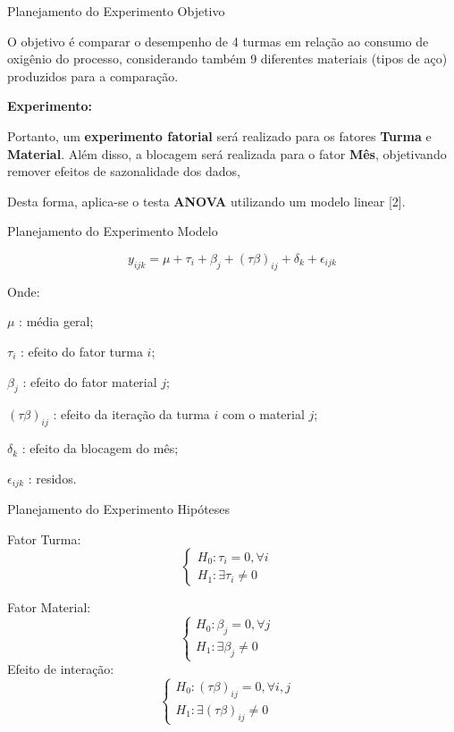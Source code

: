 \documentclass[
  ignorenonframetext,
]{beamer}
\begin{document}
\begin{frame}{Planejamento do Experimento \textbar{} Objetivo}
\protect\hypertarget{planejamento-do-experimento-objetivo}{}

O objetivo é comparar o desempenho de 4 turmas em relação ao consumo de
oxigênio do processo, considerando também 9 diferentes materiais (tipos
de aço) produzidos para a comparação.

\textbf{Experimento:}

Portanto, um \textbf{experimento fatorial} será realizado para os
fatores \textbf{Turma} e \textbf{Material}. Além disso, a blocagem será
realizada para o fator \textbf{Mês}, objetivando remover efeitos de
sazonalidade dos dados,

Desta forma, aplica-se o testa \textbf{ANOVA} utilizando um modelo
linear {[}2{]}.

\end{frame}

\begin{frame}{Planejamento do Experimento \textbar{} Modelo}
\protect\hypertarget{planejamento-do-experimento-modelo}{}

\[\begin{equation}y_{ijk} = \mu + \tau_i + \beta_j + (\tau\beta)_{ij} + \delta_k +  \epsilon_{ijk}  \end{equation}\]

Onde:

\(\mu\) : média geral;

\(\tau_i\) : efeito do fator turma \(i\);

\(\beta_j\) : efeito do fator material \(j\);

\((\tau\beta)_{ij}\) : efeito da iteração da turma \(i\) com o material
\(j\);

\(\delta_k\) : efeito da blocagem do mês;

\(\epsilon_{ijk}\) : residos.

\end{frame}

\begin{frame}{Planejamento do Experimento \textbar{} Hipóteses}
\protect\hypertarget{planejamento-do-experimento-hipoteses}{}

Fator Turma:
\[\begin{cases} H_0: \tau_{i} = 0, \forall i &\\H_1:\exists \tau_{i} \neq 0 \end{cases}\]

Fator Material:
\[\begin{cases} H_0: \beta_{j} = 0, \forall j &\\H_1:\exists \beta_{j} \neq 0 \end{cases}\]
Efeito de interação:
\[\begin{cases} H_0: (\tau\beta)_{ij} = 0, \forall i,j &\\H_1:\exists (\tau\beta)_{ij} \neq 0 \end{cases}\]

\end{frame}
\end{document}
